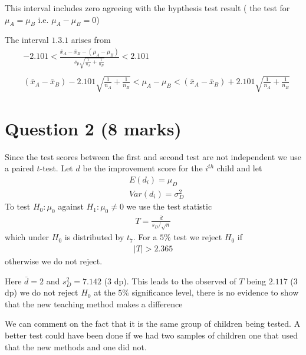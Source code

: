\documentclass[11pt]{article}
\begin{document}
This interval includes zero agreeing with the hypthesis test result ( the test for $\mu_{A}=\mu_{B}$ i.e. $\mu_{A}-\mu_{B}=0$)

The interval $1.3.1$ arises from
\begin{align*}
  & -2.101< \frac{\bar{x}_{A}-\bar{x}_{B}- (\mu_{A}-\mu_{B})}{s_{p}\sqrt{\frac{1}{n_{A}}+\frac{1}{n_{B}}}} < 2.101 \\  \\
  & (\bar{x}_{A}-\bar{x}_{B})-2.101\sqrt{\frac{1}{n_{A}}+\frac{1}{n_{B}}} < \mu_{A}-\mu_{B} < (\bar{x}_{A}-\bar{x}_{B})+2.101\sqrt{\frac{1}{n_{A}}+\frac{1}{n_{B}}}
\end{align*}
\section{Question 2 (8 marks)}
Since the test scores between the first and second test are not independent we use a paired $t$-test. Let $d$ be the improvement score for the $i^{th}$ child and let
\begin{align*}
  & E(d_{i})=\mu_{D} \\
  & Var(d_{i})=\sigma_{D}^{2}
\end{align*}
To test $H_{0}: \mu_{0}$ against $H_{1}: \mu_{0} \neq 0$ we use the test statistic
\begin{align*}
  T = \frac{\bar{d}}{s_{D}/\sqrt{n}}
\end{align*}
which under $H_{0}$ is distributed by $t_{7}$. For a $5\%$ test we reject $H_{0}$ if
\begin{align*}
  \lvert T \rvert >2.365
\end{align*}
otherwise we do not reject.

Here $\bar{d} =2$ and $s_{D}^{2} = 7.142$ (3 dp). This leads to the observed of $T$ being $2.117$ (3 dp) we do not reject $H_{0}$ at the $5\%$ significance level, there is no evidence to show that the new teaching method makes a difference

We can comment on the fact that it is the same group of children being tested. A better test could have been done if we had two samples of children one that used that the new methods and one did not.
\end{document}
